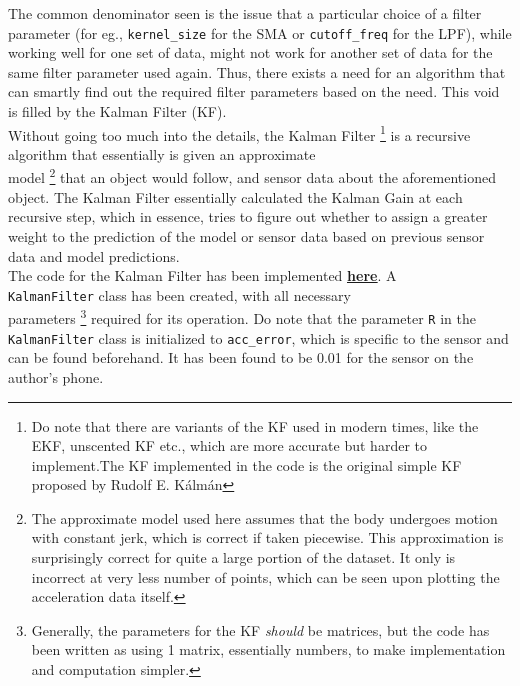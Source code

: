 \documentclass[oneside]{book}
\begin{document}
\bigskip
The common denominator seen is the issue that a particular choice of a filter parameter (for eg., \verb|kernel_size| for the SMA or \verb|cutoff_freq| for the LPF), while working well for one set of data, might not work for another set of data for the same filter parameter used again. Thus, there exists a need for an algorithm that can smartly find out the required filter parameters based on the need. This void is filled by the Kalman Filter (KF).\\ 
\bigskip
Without going too much into the details, the Kalman Filter \footnote{Do note that there are variants of the KF used in modern times, like the EKF, unscented KF etc., which are more accurate but harder to implement.The KF implemented in the code is the original simple KF proposed by Rudolf E. Kálmán} is a recursive algorithm that essentially is given an approximate\\ model \footnote{The approximate model used here assumes that the body undergoes motion with constant jerk, which is correct if taken piecewise. This approximation is surprisingly correct for quite a large portion of the dataset. It only is incorrect at very less number of points, which can be seen upon plotting the acceleration data itself.} that an object would follow, and sensor data about the aforementioned object. The Kalman Filter essentially calculated the Kalman Gain at each recursive step, which in essence, tries to figure out whether to assign a greater weight to the prediction of the model or sensor data based on previous sensor data and model predictions. \\ \bigskip
The code for the Kalman Filter has been implemented \href{https://github.com/HarryNyquist/Odometry/blob/main/Codes/1_KalmanFilter.cpp}{\underline{\textbf{here}}}. A \\ \verb|KalmanFilter| class has been created, with all necessary \\ parameters \footnote{Generally, the parameters for the KF \textit{should} be matrices, but the code has been written as using 1 matrix, essentially numbers, to make implementation and computation simpler.} required for its operation. Do note that the parameter \verb|R| in the \verb|KalmanFilter| class is initialized to \verb|acc_error|, which is specific to the sensor and can be found beforehand. It has been found to be 0.01 for the sensor on the author's phone. \newpage
\end{document}
